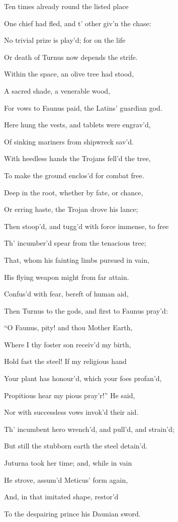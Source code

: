 Ten times already round the listed place

One chief had fled, and t’ other giv’n the chase:

No trivial prize is play’d; for on the life

Or death of Turnus now depends the strife.

Within the space, an olive tree had stood,

A sacred shade, a venerable wood,

For vows to Faunus paid, the Latins’ guardian god.

Here hung the vests, and tablets were engrav’d,

Of sinking mariners from shipwreck sav’d.

With heedless hands the Trojans fell’d the tree,

To make the ground enclos’d for combat free.

Deep in the root, whether by fate, or chance,

Or erring haste, the Trojan drove his lance;

Then stoop’d, and tugg’d with force immense, to free

Th’ incumber’d spear from the tenacious tree;

That, whom his fainting limbs pursued in vain,

His flying weapon might from far attain.

Confus’d with fear, bereft of human aid,

Then Turnus to the gods, and first to Faunus pray’d:

“O Faunus, pity! and thou Mother Earth,

Where I thy foster son receiv’d my birth,

Hold fast the steel! If my religious hand

Your plant has honour’d, which your foes profan’d,

Propitious hear my pious pray’r!” He said,

Nor with successless vows invok’d their aid.

Th’ incumbent hero wrench’d, and pull’d, and strain’d;

But still the stubborn earth the steel detain’d.

Juturna took her time; and, while in vain

He strove, assum’d Meticus’ form again,

And, in that imitated shape, restor’d

To the despairing prince his Daunian sword.

